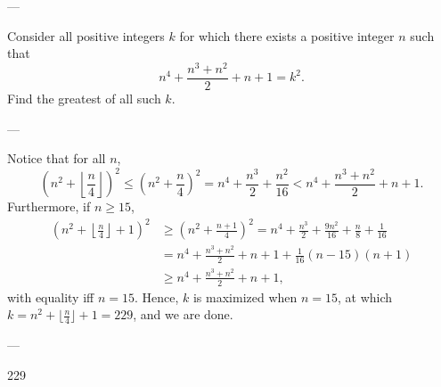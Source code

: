 
---

Consider all positive integers $k$ for which there exists a positive integer $n$ such that \[n^4+\frac{n^3+n^2}{2}+n+1 = k^2.\]
Find the greatest of all such $k$.

---

Notice that for all $n$, \[\left(n^2+\left\lfloor\frac{n}{4}\right\rfloor\right)^2 \le \left(n^2+\frac{n}{4}\right)^2 = n^4+\frac{n^3}{2}+\frac{n^2}{16} < n^4+\frac{n^3+n^2}{2}+n+1.\]
Furthermore, if $n\ge 15$,
\begin{align*}
    \left(n^2+\left\lfloor\frac n4\right\rfloor+1\right)^2&\ge\left(n^2+\frac{n+1}4\right)^2=n^4+\frac{n^3}2+\frac{9n^2}{16} +\frac n8+\frac1{16} \\
    &=n^4+\frac{n^3+n^2}{2}+n+1+\frac{1}{16}(n-15)(n+1)\\
    &\ge n^4+\frac{n^3+n^2}{2}+n+1,
\end{align*}
with equality iff $n=15$. Hence, $k$ is maximized when $n=15$, at which $k=n^2+\lfloor\tfrac n4\rfloor+1=229$, and we are done.

---

229
